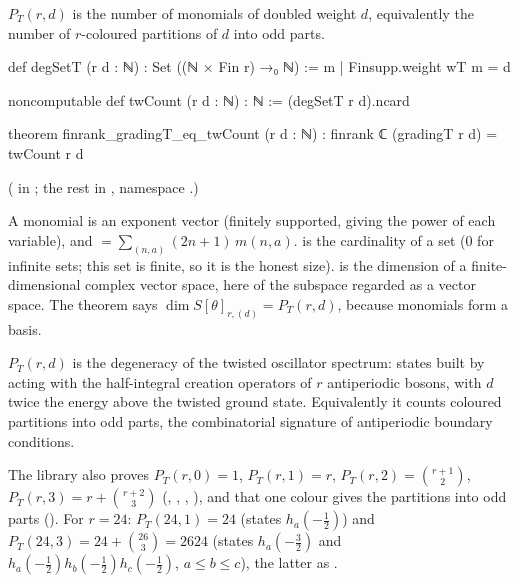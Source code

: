 \begin{definition}\label{ch05:def:twcount}
$P_T(r,d)$ is the number of monomials of doubled weight $d$, equivalently the number of $r$-coloured
partitions of $d$ into odd parts.
\end{definition}
\begin{leancode}
def degSetT (r d : ℕ) : Set ((ℕ × Fin r) →₀ ℕ) := {m | Finsupp.weight wT m = d}

noncomputable def twCount (r d : ℕ) : ℕ := (degSetT r d).ncard

theorem finrank_gradingT_eq_twCount (r d : ℕ) : finrank ℂ (gradingT r d) = twCount r d
\end{leancode}
( in ; the rest in
, namespace .)
\begin{dictionary}
A monomial is an exponent vector  (finitely supported, giving the power of
each variable), and  $= \sum_{(n,a)}(2n+1)\,m(n,a)$.  is the
cardinality of a set ($0$ for infinite sets; this set is finite, so it is the honest size).
 is the dimension of a finite-dimensional complex vector space, here of the subspace
 regarded as a vector space. The theorem says $\dim S[\theta]_{r,(d)} = P_T(r,d)$,
because monomials form a basis.
\end{dictionary}

\begin{physics}
$P_T(r,d)$ is the degeneracy of the twisted oscillator spectrum: states built by acting with the half-integral creation operators of $r$ antiperiodic bosons, with $d$ twice the energy above the twisted ground state. Equivalently it counts coloured partitions into odd parts, the combinatorial signature of antiperiodic boundary conditions.
\end{physics}

The library also proves $P_T(r,0) = 1$, $P_T(r,1) = r$, $P_T(r,2) = \binom{r+1}2$, $P_T(r,3) = r +
\binom{r+2}3$ (, , , ),
and that one colour gives the partitions into odd parts (). For $r = 24$:
$P_T(24,1) = 24$ (states $h_a(-\tfrac12)$) and $P_T(24,3) = 24 + \binom{26}{3} = 2624$ (states
$h_a(-\tfrac32)$ and $h_a(-\tfrac12)h_b(-\tfrac12) h_c(-\tfrac12)$, $a\le b\le c$), the latter as
.


